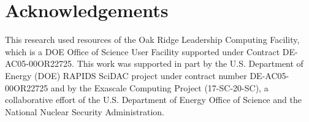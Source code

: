 \section*{Acknowledgements}

This research used resources of the Oak Ridge Leadership Computing Facility, which is a DOE Office of Science User Facility supported under Contract DE-AC05-00OR22725.
This work was supported in part by the U.S. Department of Energy (DOE) RAPIDS SciDAC project under contract number DE-AC05-00OR22725 and by the Exascale Computing Project (17-SC-20-SC), a collaborative effort of the U.S. Department of Energy Office of Science and the National Nuclear Security Administration.

